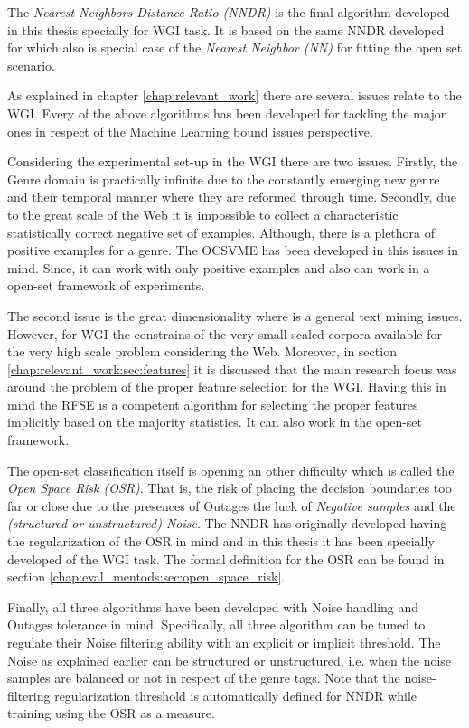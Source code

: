The \textit{Nearest Neighbors Distance Ratio (NNDR)} is the final algorithm developed in this thesis specially for WGI task. It is based on the same NNDR developed for \parencite{} which also is special case of the \textit{Nearest Neighbor (NN)} for fitting the open set scenario. 

As explained in chapter \ref{chap:relevant_work} there are several issues relate to the WGI. Every of the above algorithms has been developed for tackling the major ones in respect of the Machine Learning bound issues perspective. 

Considering the experimental set-up in the WGI there are two issues. Firstly, the Genre domain is practically infinite due to the constantly emerging new genre and their temporal manner where they are reformed through time. Secondly, due to the great scale of the Web it is impossible to collect a characteristic statistically correct negative set of examples. Although, there is a plethora of positive examples for a genre. The OCSVME has been developed in this issues in mind. Since, it can work with only positive examples and also can work in a open-set framework of experiments.

The second issue is the great dimensionality where is a general text mining issues. However, for WGI the constrains of the very small scaled corpora available for the very high scale problem considering the Web. Moreover, in section \ref{chap:relevant_work:sec:features} it is discussed that the main research focus was around the problem of the proper feature selection for the WGI. Having this in mind the RFSE is a competent algorithm for selecting the proper features implicitly based on the majority statistics. It can also work in the open-set framework.

The open-set classification itself is opening an other difficulty which is called the \textit{Open Space Risk (OSR)}. That is, the risk of placing the decision boundaries too far or close due to the presences of Outages the luck of \textit{Negative samples} and the \textit{(structured or unstructured) Noise}. The NNDR has originally developed having the regularization of the OSR in mind and in this thesis it has been specially developed of the WGI task. The formal definition for the OSR can be found in section \ref{chap:eval_mentods:sec:open_space_risk}.

Finally, all three algorithms have been developed with Noise handling and Outages tolerance in mind. Specifically, all three algorithm can be tuned to regulate their Noise filtering ability with an explicit or implicit threshold. The Noise as explained earlier can be structured or unstructured, i.e. when the noise samples are balanced or not in respect of the genre tags. Note that the noise-filtering regularization threshold is automatically defined for NNDR while training using the OSR as a measure.

